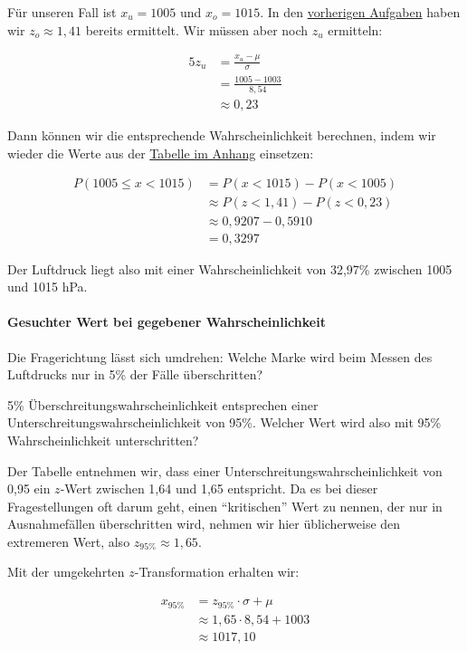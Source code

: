 \documentclass[
  ngerman,
]{article}
\begin{document}
Für unseren Fall ist \(x_u=1005\) und \(x_o=1015\). In den \protect\hyperlink{unter}{vorherigen Aufgaben} haben wir \(z_o\approx1,41\) bereits ermittelt. Wir müssen aber noch \(z_u\) ermitteln:

\[
  \begin{aligned}5
    z_u &= \frac{x_u-\mu}{\sigma} \\[4pt]
        &= \frac{1005-1003}{8,54}  \\[4pt]
        &\approx 0,23
  \end{aligned}
\]

Dann können wir die entsprechende Wahrscheinlichkeit berechnen, indem wir wieder die Werte aus der \protect\hyperlink{ptab}{Tabelle im Anhang} einsetzen:

\[
  \begin{aligned}
    P(1005 \leq x < 1015) &= P(x < 1015) - P(x < 1005) \\
    &\approx P(z < 1,41) - P(z < 0,23) \\
    &\approx 0,9207- 0,5910  \\
    &= 0,3297
  \end{aligned}
\]

Der Luftdruck liegt also mit einer Wahrscheinlichkeit von 32,97\% zwischen 1005 und 1015 hPa.

\hypertarget{gesuchter-wert-bei-gegebener-wahrscheinlichkeit}{%
\paragraph{Gesuchter Wert bei gegebener Wahrscheinlichkeit}\label{gesuchter-wert-bei-gegebener-wahrscheinlichkeit}}

Die Fragerichtung lässt sich umdrehen: Welche Marke wird beim Messen des Luftdrucks nur in 5\% der Fälle überschritten?

5\% Überschreitungswahrscheinlichkeit entsprechen einer Unterschreitungswahrscheinlichkeit von 95\%. Welcher Wert wird also mit 95\% Wahrscheinlichkeit unterschritten?

Der Tabelle entnehmen wir, dass einer Unterschreitungswahrscheinlichkeit von 0,95 ein \(z\)-Wert zwischen 1,64 und 1,65 entspricht. Da es bei dieser Fragestellungen oft darum geht, einen ``kritischen'' Wert zu nennen, der nur in Ausnahmefällen überschritten wird, nehmen wir hier üblicherweise den extremeren Wert, also \(z_{95\%}\approx 1,65\).

Mit der umgekehrten \(z\)-Transformation erhalten wir:

\[
  \begin{aligned}
    x_{95\%}&=z_{95\%}\cdot \sigma + \mu \\
       &\approx 1,65\cdot 8,54 + 1003\\
       &\approx 1017,10
  \end{aligned}
\]
\end{document}
